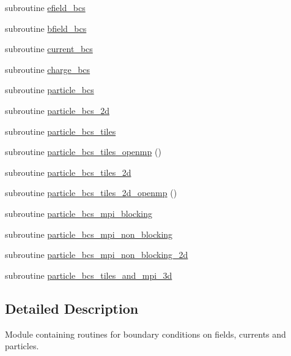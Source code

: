 \begin{DoxyCompactItemize}
\item 
subroutine \hyperlink{namespaceboundary_a2397a80ea9511ae3266ad16c668cc547}{efield\+\_\+bcs}
\item 
subroutine \hyperlink{namespaceboundary_af2316f12b3b85debc7214c4c47035322}{bfield\+\_\+bcs}
\item 
subroutine \hyperlink{namespaceboundary_a2bd382bbf256b1208d4fd3721c37ad08}{current\+\_\+bcs}
\item 
subroutine \hyperlink{namespaceboundary_a0b6d77029b51dd2a0e853c265885ab6c}{charge\+\_\+bcs}
\item 
subroutine \hyperlink{namespaceboundary_a9e7ba00d025d595683607b3ccd95bcb3}{particle\+\_\+bcs}
\item 
subroutine \hyperlink{namespaceboundary_aad89819169dca0b0ae8cf04748a86fb1}{particle\+\_\+bcs\+\_\+2d}
\item 
subroutine \hyperlink{namespaceboundary_added6cf2ea0ffc7ab618c3d9af16fade}{particle\+\_\+bcs\+\_\+tiles}
\item 
subroutine \hyperlink{namespaceboundary_af6d7a140eef6818609e44869b67cd3a7}{particle\+\_\+bcs\+\_\+tiles\+\_\+openmp} ()
\item 
subroutine \hyperlink{namespaceboundary_afb4e6ab09e288dab2bb9ce2d731e276f}{particle\+\_\+bcs\+\_\+tiles\+\_\+2d}
\item 
subroutine \hyperlink{namespaceboundary_a9f9517df19ef503bb2a69e63aeec91d4}{particle\+\_\+bcs\+\_\+tiles\+\_\+2d\+\_\+openmp} ()
\item 
subroutine \hyperlink{namespaceboundary_a1789d63402ac897697791a2fca4fa8e6}{particle\+\_\+bcs\+\_\+mpi\+\_\+blocking}
\item 
subroutine \hyperlink{namespaceboundary_aac32f7f65f1998963706f9d5776d29d2}{particle\+\_\+bcs\+\_\+mpi\+\_\+non\+\_\+blocking}
\item 
subroutine \hyperlink{namespaceboundary_a3293856926030dfea9e8ca05c61e1a5a}{particle\+\_\+bcs\+\_\+mpi\+\_\+non\+\_\+blocking\+\_\+2d}
\item 
subroutine \hyperlink{namespaceboundary_ac117306978e83b787afba90c3ac038f4}{particle\+\_\+bcs\+\_\+tiles\+\_\+and\+\_\+mpi\+\_\+3d}
\end{DoxyCompactItemize}


\subsection{Detailed Description}
Module containing routines for boundary conditions on fields, currents and particles. 

